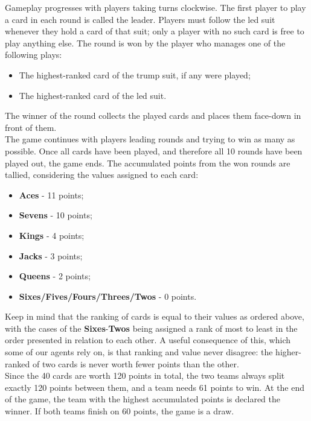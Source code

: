 \documentclass[sigconf]{acmart}
\begin{document}
\noindent Gameplay progresses with players taking turns clockwise. The first player to play a card in each round is called the leader. Players must follow the led suit whenever they hold a card of that suit; only a player with no such card is free to play anything else. The round is won by the player who manages one of the following plays:
\begin{itemize}
    \item The highest-ranked card of the trump suit, if any were played;
    \item The highest-ranked card of the led suit.
\end{itemize}

\noindent The winner of the round collects the played cards and places them face-down in front of them.\\

\noindent The game continues with players leading rounds and trying to win as many as possible. Once all cards have been played, and therefore all 10 rounds have been played out, the game ends. The accumulated points from the won rounds are tallied, considering the values assigned to each card:
\begin{itemize}
    \item \textbf{Aces} - 11 points;
    \item \textbf{Sevens} - 10 points;
    \item \textbf{Kings} - 4 points;
    \item \textbf{Jacks} - 3 points;
    \item \textbf{Queens} - 2 points;
    \item \textbf{Sixes/Fives/Fours/Threes/Twos} - 0 points.
\end{itemize}

\noindent Keep in mind that the ranking of cards is equal to their values as ordered above, with the cases of the \textbf{Sixes}-\textbf{Twos} being assigned a rank of most to least in the order presented in relation to each other. A useful consequence of this, which some of our agents rely on, is that ranking and value never disagree: the higher-ranked of two cards is never worth fewer points than the other.\\

\noindent Since the 40 cards are worth 120 points in total, the two teams always split exactly 120 points between them, and a team needs 61 points to win. At the end of the game, the team with the highest accumulated points is declared the winner. If both teams finish on 60 points, the game is a draw.\\
\end{document}
